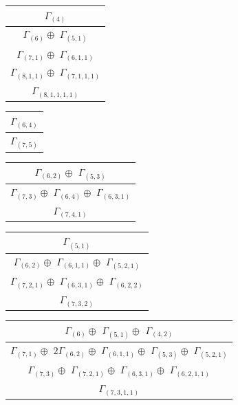 \documentclass[main.tex]{subfiles}
\begin{document}
\begin{minipage}{.2\textwidth}
\centering
\begin{tabular}{c}
$\Gamma_{(
4
)}$
\\ \hline
$\Gamma_{(
6
)} \oplus$
$\Gamma_{(
5 , 
1
)}$
\\ \hline
$\Gamma_{(
7 , 
1
)} \oplus$
$\Gamma_{(
6 , 
1 , 
1
)}$
\\ \hline
$\Gamma_{(
8 , 
1 , 
1
)} \oplus$
$\Gamma_{(
7 , 
1 , 
1 , 
1
)}$
\\ \hline
$\Gamma_{(
8 , 
1 , 
1 , 
1 , 
1
)}$
\\
\end{tabular}\end{minipage}
\begin{minipage}{.2\textwidth}
\centering
\begin{tabular}{c}
$\Gamma_{(
6 , 
4
)}$
\\ \hline
$\Gamma_{(
7 , 
5
)}$
\\
\end{tabular}\end{minipage}
\bigskip
\begin{minipage}{.3\textwidth}
\centering
\begin{tabular}{c}
$\Gamma_{(
6 , 
2
)} \oplus$
$\Gamma_{(
5 , 
3
)}$
\\ \hline
$\Gamma_{(
7 , 
3
)} \oplus$
$\Gamma_{(
6 , 
4
)} \oplus$
$\Gamma_{(
6 , 
3 , 
1
)}$
\\ \hline
$\Gamma_{(
7 , 
4 , 
1
)}$
\\
\end{tabular}\end{minipage}
\begin{minipage}{.3\textwidth}
\centering
\begin{tabular}{c}
$\Gamma_{(
5 , 
1
)}$
\\ \hline
$\Gamma_{(
6 , 
2
)} \oplus$
$\Gamma_{(
6 , 
1 , 
1
)} \oplus$
$\Gamma_{(
5 , 
2 , 
1
)}$
\\ \hline
$\Gamma_{(
7 , 
2 , 
1
)} \oplus$
$\Gamma_{(
6 , 
3 , 
1
)} \oplus$
$\Gamma_{(
6 , 
2 , 
2
)}$
\\ \hline
$\Gamma_{(
7 , 
3 , 
2
)}$
\\
\end{tabular}\end{minipage}
\begin{minipage}{.4\textwidth}
\centering
\begin{tabular}{c}
$\Gamma_{(
6
)} \oplus$
$\Gamma_{(
5 , 
1
)} \oplus$
$\Gamma_{(
4 , 
2
)}$
\\ \hline
$\Gamma_{(
7 , 
1
)} \oplus$
$ 2 \Gamma_{(
6 , 
2
)} \oplus$
$\Gamma_{(
6 , 
1 , 
1
)} \oplus$
$\Gamma_{(
5 , 
3
)} \oplus$
$\Gamma_{(
5 , 
2 , 
1
)}$
\\ \hline
$\Gamma_{(
7 , 
3
)} \oplus$
$\Gamma_{(
7 , 
2 , 
1
)} \oplus$
$\Gamma_{(
6 , 
3 , 
1
)} \oplus$
$\Gamma_{(
6 , 
2 , 
1 , 
1
)}$
\\ \hline
$\Gamma_{(
7 , 
3 , 
1 , 
1
)}$
\\
\end{tabular}\end{minipage}
\end{document}
